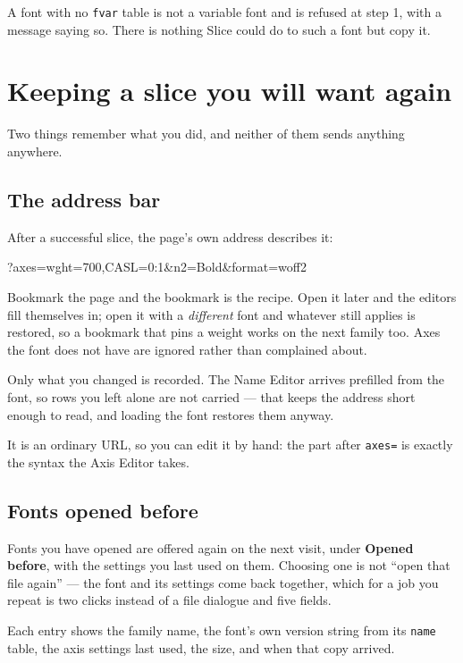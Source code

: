 \documentclass[11pt,a4paper]{article}
\begin{document}
A font with no \texttt{fvar} table is not a variable font and is refused at step 1, with a message saying so. There is nothing Slice could do to such a font but copy it.

\section{Keeping a slice you will want again}

Two things remember what you did, and neither of them sends anything anywhere.

\subsection{The address bar}

After a successful slice, the page's own address describes it:

\begin{code}
?axes=wght=700,CASL=0:1&n2=Bold&format=woff2
\end{code}

Bookmark the page and the bookmark is the recipe. Open it later and the editors fill themselves in; open it with a \emph{different} font and whatever still applies is restored, so a bookmark that pins a weight works on the next family too. Axes the font does not have are ignored rather than complained about.

Only what you changed is recorded. The Name Editor arrives prefilled from the font, so rows you left alone are not carried --- that keeps the address short enough to read, and loading the font restores them anyway.

It is an ordinary URL, so you can edit it by hand: the part after \texttt{axes=} is exactly the syntax the Axis Editor takes.

\subsection{Fonts opened before}

Fonts you have opened are offered again on the next visit, under \textbf{Opened before}, with the settings you last used on them. Choosing one is not ``open that file again'' --- the font and its settings come back together, which for a job you repeat is two clicks instead of a file dialogue and five fields.

Each entry shows the family name, the font's own version string from its \texttt{name} table, the axis settings last used, the size, and when that copy arrived.
\end{document}
